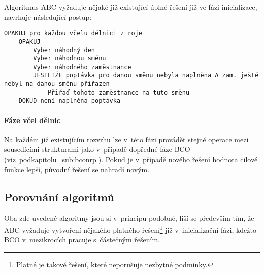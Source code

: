 \documentclass[twoside]{ctuthesis}
\begin{document}
Algoritmus ABC vyžaduje nějaké již existující úplné řešení již ve fázi inicializace, \cite{buyukozkan2014applicability} navrhuje následující postup:
\begin{lstlisting}[caption={Pseudokód pro ABC}]
OPAKUJ pro každou včelu dělnici z roje
	OPAKUJ
		Vyber náhodný den
		Vyber náhodnou směnu
		Vyber náhodného zaměstnance
		JESTLIŽE poptávka pro danou směnu nebyla naplněna A zam. ještě nebyl na danou směnu přiřazen
			Přiřaď tohoto zaměstnance na tuto směnu
	DOKUD není naplněna poptávka
\end{lstlisting}

\paragraph{Fáze včel dělnic}
Na každém již existujícím rozvrhu lze v~této fázi provádět stejné operace mezi sousedícími strukturami jako v~případě dopředné fáze BCO (viz~podkapitolu~\ref{sub:bconrp}). Pokud je v~případě nového řešení hodnota cílové funkce lepší, původní řešení se nahradí novým.

\subsection{Porovnání algoritmů}
Oba zde uvedené algoritmy jsou si v~principu podobné, liší se především tím, že ABC vyžaduje vytvoření nějakého platného řešení\footnote{Platné je takové řešení, které neporušuje nezbytné podmínky.} již v~inicializační fázi, kdežto BCO v~mezikrocích pracuje s~částečným řešením.
\end{document}
